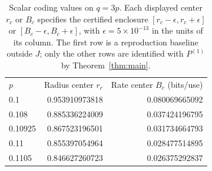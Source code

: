 \begin{table}[t]
\caption{Scalar coding values on $q=3p$. Each displayed center $r_c$ or $B_c$ specifies the certified enclosure $[r_c-\epsilon,r_c+\epsilon]$ or $[B_c-\epsilon,B_c+\epsilon]$, with $\epsilon=5\times10^{-13}$ in the units of its column. The first row is a reproduction baseline outside $J$; only the other rows are identified with $P^{(1)}$ by Theorem~\ref{thm:main}.}
\label{tab:rates}
\begin{ruledtabular}
\begin{tabular}{lrr}
$p$ & Radius center $r_c$ & Rate center $B_c$ (bits/use) \\
0.1 & 0.953910973818 & 0.080069665092 \\
0.108 & 0.885336224009 & 0.037424196795 \\
0.10925 & 0.867523196501 & 0.031734664793 \\
0.11 & 0.855397054964 & 0.028477514895 \\
0.1105 & 0.846627260723 & 0.026375292837 \\
\end{tabular}
\end{ruledtabular}
\end{table}
